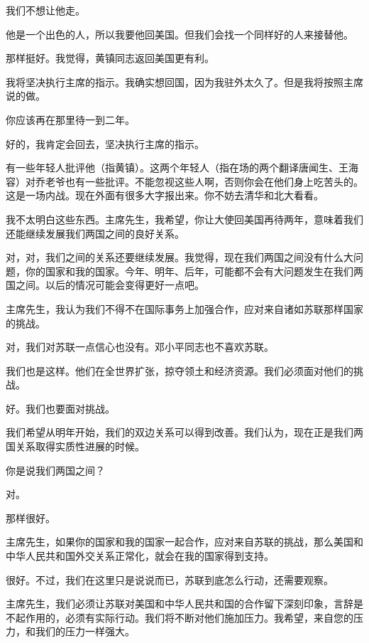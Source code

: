 我们不想让他走。

他是一个出色的人，所以我要他回美国。但我们会找一个同样好的人来接替他。

那样挺好。我觉得，黄镇同志返回美国更有利。

我将坚决执行主席的指示。我确实想回国，因为我驻外太久了。但是我将按照主席说的做。

你应该再在那里待一到二年。

好的，我肯定会回去，坚决执行主席的指示。

有一些年轻人批评他（指黄镇）。这两个年轻人（指在场的两个翻译唐闻生、王海容）对乔老爷也有一些批评。不能忽视这些人啊，否则你会在他们身上吃苦头的。这是一场内战。现在外面有很多大字报出来。你不妨去清华和北大看看。

我不太明白这些东西。主席先生，我希望，你让大使回美国再待两年，意味着我们还能继续发展我们两国之间的良好关系。

对，对，我们之间的关系还要继续发展。我觉得，现在我们两国之间没有什么大问题，你的国家和我的国家。今年、明年、后年，可能都不会有大问题发生在我们两国之间。以后的情况可能会变得更好一点吧。

主席先生，我认为我们不得不在国际事务上加强合作，应对来自诸如苏联那样国家的挑战。

对，我们对苏联一点信心也没有。邓小平同志也不喜欢苏联。

我们也是这样。他们在全世界扩张，掠夺领土和经济资源。我们必须面对他们的挑战。

好。我们也要面对挑战。

我们希望从明年开始，我们的双边关系可以得到改善。我们认为，现在正是我们两国关系取得实质性进展的时候。

你是说我们两国之间？

对。

那样很好。

主席先生，如果你的国家和我的国家一起合作，应对来自苏联的挑战，那么美国和中华人民共和国外交关系正常化，就会在我的国家得到支持。

很好。不过，我们在这里只是说说而已，苏联到底怎么行动，还需要观察。

主席先生，我们必须让苏联对美国和中华人民共和国的合作留下深刻印象，言辞是不起作用的，必须有实际行动。我们将不断对他们施加压力。我希望，来自您的压力，和我们的压力一样强大。


